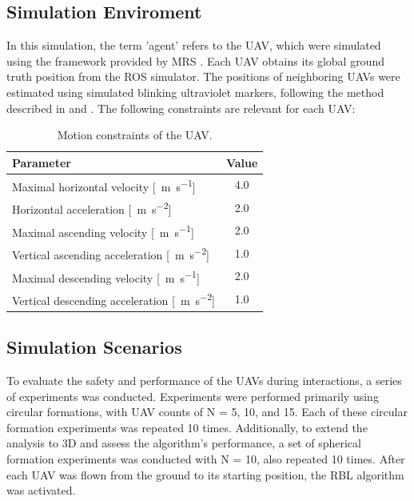     \subsection{Simulation Enviroment}
        In this simulation, the term 'agent' refers to the \ac{UAV}, which were simulated using the framework provided by \ac{MRS} \cite{mrs_uav_system}.
        Each \ac{UAV} obtains its global ground truth position from the ROS simulator.
        The positions of neighboring \ac{UAV}s were estimated using simulated blinking ultraviolet markers, following the method described in \cite{uvdd1} and \cite{uvdar_package}.
        The following constraints are relevant for each \ac{UAV}:
        \begin{table}[h]
            \centering
            \renewcommand{\arraystretch}{1.1}
            \begin{tabular}{|l|c|}
                \hline
                \textbf{Parameter} & \textbf{Value} \\ \hline
                    Maximal horizontal velocity [\SI{}{\meter\per\second}] & 4.0 \\ \hline
                    Horizontal acceleration [\SI{}{\meter\per\second\squared}] & 2.0 \\ \hline
                    Maximal ascending velocity [\SI{}{\meter\per\second}] & 2.0 \\ \hline
                    Vertical ascending acceleration [\SI{}{\meter\per\second\squared}] & 1.0 \\ \hline
                    Maximal descending velocity [\SI{}{\meter\per\second}] & 2.0 \\ \hline
                    Vertical descending acceleration [\SI{}{\meter\per\second\squared}] & 1.0 \\ \hline
                \end{tabular}
                \caption{Motion constraints of the \ac{UAV}.}
            \label{tab:uav_constraints}
        \end{table}
        
    \subsection{Simulation Scenarios}
        To evaluate the safety and performance of the \ac{UAV}s during interactions, a series of experiments was conducted. 
        Experiments were performed primarily using circular formations, with \ac{UAV} counts of N = 5, 10, and 15. 
        Each of these circular formation experiments was repeated 10 times.
        Additionally, to extend the analysis to 3D and assess the algorithm's performance, a set of spherical formation experiments was conducted with N = 10, also repeated 10 times.
        After each \ac{UAV} was flown from the ground to its starting position, the \ac{RBL} algorithm was activated.    

